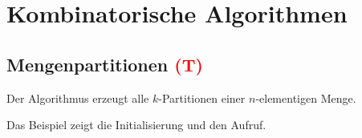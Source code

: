 \section{Kombinatorische Algorithmen}

\subsection{Mengenpartitionen \textcolor{red}{(T)}} %
Der Algorithmus erzeugt alle $k$-Partitionen einer $n$-elementigen Menge.

Das Beispiel zeigt die Initialisierung und den Aufruf.
